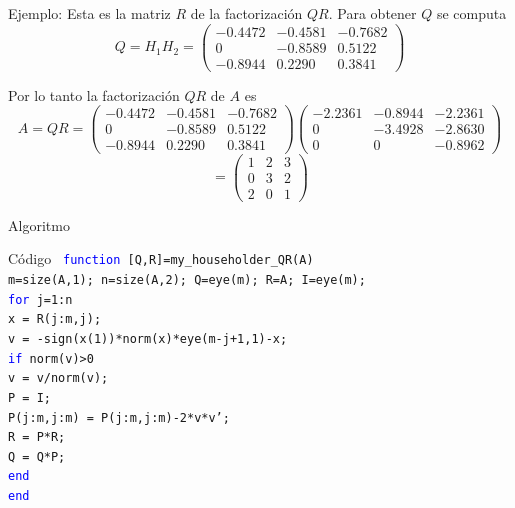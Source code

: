 \documentclass{beamer}
\begin{document}
\begin{frame}{Ejemplo:}
  Esta es la matriz $R$ de la factorizaci\'on $QR$. Para obtener $Q$ se computa
  $$
  Q=H_1H_2 = \left(\begin{array}{ccc}
    -0.4472 &  -0.4581 & -0.7682\\
        0 & -0.8589 & 0.5122\\
  -0.8944 &  0.2290 & 0.3841
        \end{array}\right)
  $$

  Por lo tanto la factorizaci\'on $QR$ de $A$ es
  \scriptsize{
  $$
  A = QR = \left(\begin{array}{ccc}
    -0.4472 &  -0.4581 & -0.7682\\
        0 & -0.8589 & 0.5122\\
  -0.8944 &  0.2290 & 0.3841
        \end{array}\right) \left(\begin{array}{ccc}
    -2.2361 & -0.8944 & -2.2361\\
    0 & -3.4928 & -2.8630\\
    0 & 0 & -0.8962
        \end{array}\right)
  $$}
  \normalsize
  $$
  = \left(\begin{array}{ccc}
    1 &  2 & 3\\
        0 & 3 & 2\\
  2 &  0 & 1
        \end{array}\right)
  $$
\end{frame}
\begin{frame}{Algoritmo}
  \begin{block}{C\'odigo}
\texttt{
\hspace{-0.25cm}\textcolor{blue}{function} [Q,R]=my\_householder\_QR(A)\\
m=size(A,1); n=size(A,2); Q=eye(m); R=A; I=eye(m);\\
\textcolor{blue}{for} j=1:n\\
\hspace{0.25cm} x = R(j:m,j);\\
\hspace{0.25cm} v = -sign(x(1))*norm(x)*eye(m-j+1,1)-x;\\
\hspace{0.25cm} \textcolor{blue}{if} norm(v)>0\\
\hspace{0.5cm} v = v/norm(v);\\
\hspace{0.5cm} P = I;\\
\hspace{0.5cm} P(j:m,j:m) = P(j:m,j:m)-2*v*v';\\
\hspace{0.5cm} R = P*R;\\
\hspace{0.5cm} Q = Q*P;\\
\hspace{0.25cm} \textcolor{blue}{end}\\
\textcolor{blue}{end}
}
\end{block}
\end{frame}
\end{document}
